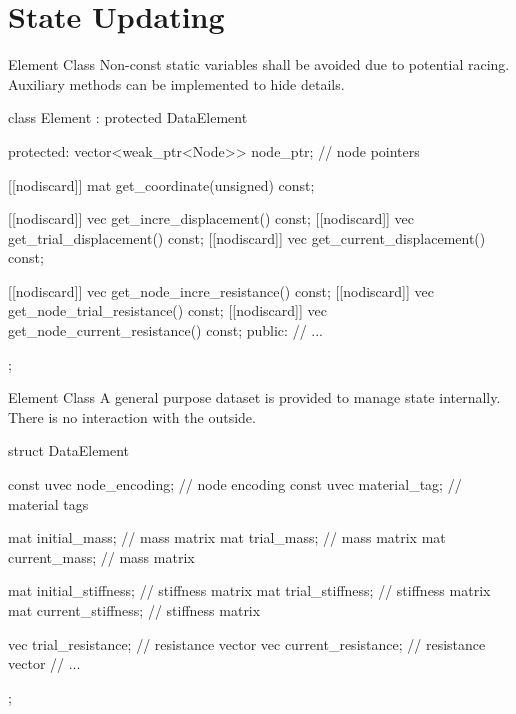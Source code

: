\documentclass[fleqn,10pt]{beamer}
\begin{document}
\section{State Updating}
\begin{frame}[standout]
\begin{figure}[H]
\centering\scriptsize
{}
\end{figure}
\end{frame}
\begin{frame}[containsverbatim]{Element Class}
Non-const static variables shall be avoided due to potential racing.
Auxiliary methods can be implemented to hide details.
\begin{cppcode}
class Element : protected DataElement {
protected:
    vector<weak_ptr<Node>> node_ptr; // node pointers

    [[nodiscard]] mat get_coordinate(unsigned) const;

    [[nodiscard]] vec get_incre_displacement() const;
    [[nodiscard]] vec get_trial_displacement() const;
    [[nodiscard]] vec get_current_displacement() const;

    [[nodiscard]] vec get_node_incre_resistance() const;
    [[nodiscard]] vec get_node_trial_resistance() const;
    [[nodiscard]] vec get_node_current_resistance() const;
public:
    // ...
};
\end{cppcode}
\end{frame}
\begin{frame}[containsverbatim]{Element Class}
A general purpose dataset is provided to manage state internally.
There is no interaction with the outside.
\begin{cppcode}
struct DataElement {
    const uvec node_encoding; // node encoding
    const uvec material_tag;  // material tags

    mat initial_mass{}; // mass matrix
    mat trial_mass{};   // mass matrix
    mat current_mass{}; // mass matrix

    mat initial_stiffness{}; // stiffness matrix
    mat trial_stiffness{};   // stiffness matrix
    mat current_stiffness{}; // stiffness matrix

    vec trial_resistance{};            // resistance vector
    vec current_resistance{};          // resistance vector
    // ...
};
\end{cppcode}
\end{frame}
\end{document}
